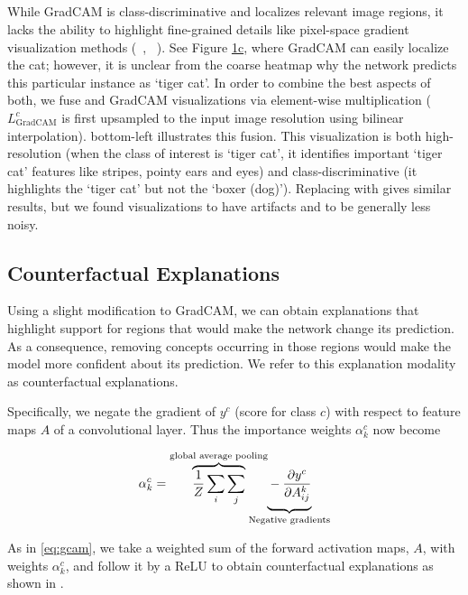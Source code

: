 \vspace{-5pt}
\subsection{\cgb{}}
While GradCAM is class-discriminative and localizes relevant image regions,
it lacks the ability to highlight fine-grained details like pixel-space gradient
visualization methods (\gb{}~\cite{springenberg_arxiv14}, \dec{}~\cite{zeiler_eccv14}).
See Figure \hyperlink{page.2}{1c}, where
GradCAM can easily localize the cat; however, it is unclear from the coarse
heatmap why the network predicts this particular instance as `tiger cat'.
In order to combine the best aspects of both, we fuse \gb{} and GradCAM visualizations
via element-wise multiplication
($L_{\text{GradCAM}}^c$ is first upsampled to the input image resolution using bilinear interpolation).
 bottom-left illustrates this fusion.
This visualization is both high-resolution (when the class of interest is `tiger cat',
it identifies important `tiger cat' features like stripes, pointy ears and eyes) and
class-discriminative (it highlights the `tiger cat' but not the `boxer (dog)').
Replacing \gb{} with \dec{} gives similar results, but we found \dec{}
visualizations to have artifacts and \gb{} to be generally less noisy.

\subsection{Counterfactual Explanations}


Using a slight modification to GradCAM, we can obtain explanations
that highlight support for regions that would make the network change its prediction. 
As a consequence, removing concepts occurring in those regions would make the
model more confident about its prediction. 
We refer to this explanation modality as counterfactual explanations.

Specifically, we negate the gradient of $y^c$ (score for class $c$) with respect to feature maps $A$ of a convolutional layer.
Thus the importance weights $\alpha{}_{k}^{c}$ now become
\begin{center}
\begin{equation} \label{eq:alpha_neg}
    \alpha{}_{k}^c =
    \overbrace{
        \frac{1}{Z}\sum_{i}\sum_{j}
    }^{\text{global average pooling}}
    \hspace{-17pt}
    \underbrace{
        \vphantom{\sum_{i}\sum_{j}} -\frac{\partial y^c}{\partial A_{ij}^{k}}
    }_{\text{Negative gradients}}
\end{equation}
\end{center}
As in \eqref{eq:gcam}, we take a weighted sum of the forward activation maps, $A$, with weights $\alpha{}_{k}^c$, and follow it by a ReLU to obtain counterfactual explanations as shown in .

